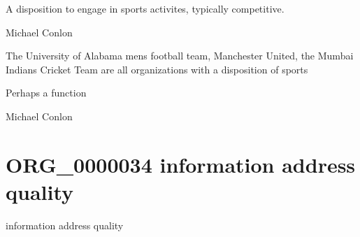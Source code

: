 \documentclass[letterpaper,10pt,english]{sphinxmanual}
\begin{document}
\begin{sphinxShadowBox}

\sphinxAtStartPar
A disposition to engage in sports activites, typically competitive.
\end{sphinxShadowBox}

\begin{sphinxShadowBox}

\sphinxAtStartPar
Michael Conlon 
\end{sphinxShadowBox}

\begin{sphinxShadowBox}

\sphinxAtStartPar
The University of Alabama mens football team, Manchester United, the Mumbai Indians Cricket Team are all organizations with a disposition of sports
\end{sphinxShadowBox}

\begin{sphinxShadowBox}

\sphinxAtStartPar
Perhaps a function
\end{sphinxShadowBox}

\begin{sphinxShadowBox}

\sphinxAtStartPar
Michael Conlon 
\end{sphinxShadowBox}
\begin{quote}
\label{\detokenize{doc-ORG_0000034:org-0000034}}\label{\detokenize{doc-ORG_0000034:information-address-quality}}\label{\detokenize{doc-ORG_0000034:org-0000034}}
\ignorespaces \end{quote}


\section{ORG\_0000034 \sphinxhyphen{} information address quality}
\label{\detokenize{doc-ORG_0000034:org-0000034-information-address-quality}}\label{\detokenize{doc-ORG_0000034:index-0}}\label{\detokenize{doc-ORG_0000034::doc}}
\begin{sphinxShadowBox}

\sphinxAtStartPar
information address quality
\end{sphinxShadowBox}
\end{document}
